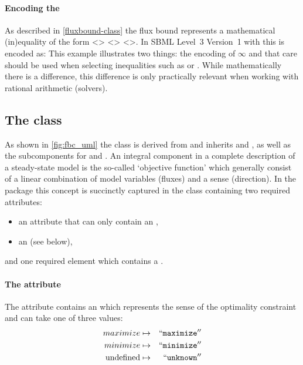 \paragraph{Encoding the \FluxBound}
As described in \ref{fluxbound-class} the flux bound represents a mathematical (in)equality of the form <> <> <>. In SBML Level~3 Version~1 with \FBC this is encoded as:
%
%
This example illustrates two things: the encoding of $\infty$ and that care should be used when selecting inequalities such as  or . While mathematically there is a difference, this difference is only practically relevant when working with rational arithmetic (solvers).


\subsection{The \FBC {} class}
\label{objective-class}
\label{listoffluxobjectives-class}

As shown in \ref{fig:fbc_uml} the \FBC \Objective class is derived from \SBML \SBase and inherits  and , as well as the subcomponents for \Annotation and \Notes. An integral component in a complete description of a steady-state model is the so-called `objective function' which generally consist of a linear combination of model variables (fluxes) and a sense (direction). In the \FBC package this concept is succinctly captured in the \Objective class containing two required attributes:

\begin{itemize}
  \item {} an attribute that can only contain an ,
  \item {} an  (see below),
\end{itemize}

and one required element  which contains a \ListOfFluxObjectives.


\paragraph{The  attribute}
The  attribute contains an  which represents the sense of the optimality constraint and can take one of three values:
\begin{eqnarray*}
\label{obj-type-enum}
 \nonumber
  maximize & \mapsto & ``\textcolor{black}{\textup{\ttfamily{maximize}}}''\\
  minimize & \mapsto & ``\textcolor{black}{\textup{\ttfamily{minimize}}}''\\
 \textrm{undefined} & \mapsto & ``\textcolor{black}{\textup{\ttfamily{unknown}}}''
\end{eqnarray*}

